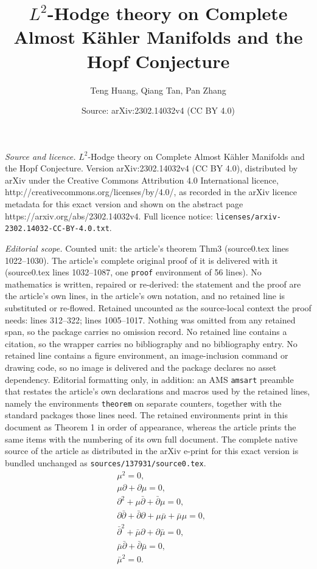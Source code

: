\documentclass[10pt,a4paper]{amsart}
\title{$L^{2}$-Hodge theory on Complete Almost K\"{a}hler Manifolds and the Hopf Conjecture}
\author{Teng Huang, Qiang Tan, Pan Zhang}
\date{Source: arXiv:2302.14032v4 (CC BY 4.0)}
\def\pa{\partial}
\begin{document}
\maketitle

\noindent\emph{Source and licence.} $L^{2}$-Hodge theory on Complete Almost K\"{a}hler Manifolds and the Hopf Conjecture. Version arXiv:2302.14032v4 (CC BY 4.0), distributed by arXiv under the Creative Commons Attribution 4.0 International licence, http://creativecommons.org/licenses/by/4.0/, as recorded in the arXiv licence metadata for this exact version and shown on the abstract page https://arxiv.org/abs/2302.14032v4. Full licence notice: \texttt{licenses/arxiv-2302.14032-CC-BY-4.0.txt}.\par\smallskip

\noindent\textit{Editorial scope.} Counted unit: the article's theorem Thm3 (source0.tex lines 1022--1030). The article's complete original proof of it is delivered with it (source0.tex lines 1032--1087, one \texttt{proof} environment of 56 lines). No mathematics is written, repaired or re-derived: the statement and the proof are the article's own lines, in the article's own notation, and no retained line is substituted or re-flowed.  Retained uncounted as the source-local context the proof needs: lines 312--322; lines 1005--1017.  Nothing was omitted from any retained span, so the package carries no omission record.  No retained line contains a citation, so the wrapper carries no bibliography and no bibliography entry.  No retained line contains a figure environment, an image-inclusion command or drawing code, so no image is delivered and the package declares no asset dependency.  Editorial formatting only, in addition: an AMS \texttt{amsart} preamble that restates the article's own declarations and macros used by the retained lines, namely the environments \texttt{theorem} on separate counters, together with the standard packages those lines need.  The retained environments print in this document as Theorem 1 in order of appearance, whereas the article prints the same items with the numbering of its own full document.  The complete native source of the article as distributed in the arXiv e-print for this exact version is bundled unchanged as \texttt{sources/137931/source0.tex}.
	\begin{equation}\label{E27}
	\begin{split}
	&\mu^{2}=0,\\
	&\mu\pa+\pa\mu=0,\\
	&\pa^{2}+\mu\bar{\pa}+\bar{\pa}\mu=0,\\
	&\pa\bar{\pa}+\bar{\pa}\pa+\mu\bar{\mu}+\bar{\mu}\mu=0,\\
	&\bar{\pa}^{2}+\bar{\mu}\pa+\pa\bar{\mu}=0,\\
	&\bar{\mu}\bar{\pa}+\bar{\pa}\bar{\mu}=0,\\
	&\bar{\mu}^{2}=0.\\
	\end{split}
	\end{equation} 
\end{document}
